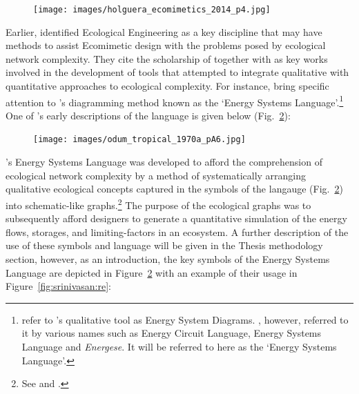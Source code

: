 \begin{figure}[H]
    \centering
    \texttt{[image: images/holguera\_ecomimetics\_2014\_p4.jpg]}
    \caption{\cite[p.~4]{holguera_ecomimetics_2014}}
    \label{fig:holguera:Ecomimetics}
\end{figure}

Earlier, \citeauthor{garcia-holguera_ecosystems_2013} identified Ecological Engineering as a key discipline that may have methods to assist Ecomimetic design with the problems posed by ecological network complexity. They cite the scholarship of \citeauthor{mitsch_ecological_1989} together with \citeauthor{odum_ecological_1994} as key works involved in the development of tools that attempted to integrate qualitative with quantitative approaches to ecological complexity. For instance, \citeauthor{garcia-holguera_ecosystems_2013} bring specific attention to \citeauthor{odum_ecological_1994}'s diagramming method known as the `Energy Systems Language'.\footnote{\citeauthor{holguera_ecomimetics_2014} refer to \citeauthor{odum_ecological_1994}'s qualitative tool as Energy System Diagrams. \citeauthor{odum_ecological_1994}, however, referred to it by various names such as Energy Circuit Language, Energy Systems Language and \textit{Energese}. It will be referred to here as the `Energy Systems Language'.} One of \citeauthor{odum_ecological_1994}'s early descriptions of the language is given below (Fig.~\ref{fig:odum:tropical}):

\begin{figure}[H]
    \centering
    \texttt{[image: images/odum\_tropical\_1970a\_pA6.jpg]}
    \caption{\cite[p.~A6]{odum_tropical_1970a}}
    \label{fig:odum:tropical}
\end{figure}

\citeauthor{odum_energy_1972}'s Energy Systems Language was developed to afford the comprehension of ecological network complexity by a method of systematically arranging qualitative ecological concepts captured in the symbols of the langauge (Fig.~\ref{fig:odum:tropical}) into schematic-like graphs.\footnote{See \citet[pp.A5-A11]{odum_tropical_1970a} and \citet[pp.~139–211]{odum_energy_1972}.} The purpose of the ecological graphs was to subsequently afford designers to generate a quantitative simulation of the energy flows, storages, and limiting-factors in an ecosystem. A further description of the use of these symbols and language will be given in the Thesis methodology section, however, as an introduction, the key symbols of the Energy Systems Language are depicted in Figure~\ref{fig:odum:tropical} with an example of their usage in Figure~\ref{fig:srinivasan:re}:

